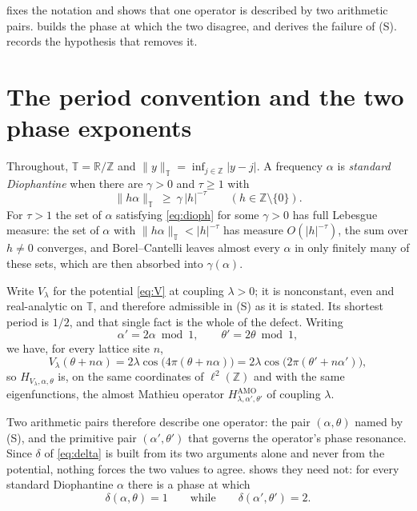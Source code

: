 \documentclass[11pt,reqno]{amsart}
\theoremstyle{plain}
\theoremstyle{definition}
\theoremstyle{remark}
\numberwithin{equation}{section}
\begin{document}
 fixes the notation and shows that one operator is
described by two arithmetic pairs.  builds the phase at
which the two disagree, and  derives the failure of (S).
 records the hypothesis that removes it.

\section{The period convention and the two phase exponents}
\label{sec:convention}

Throughout, $\mathbb T=\mathbb R/\mathbb Z$ and
$\lVert y\rVert_{\mathbb T}=\inf_{j\in\mathbb Z}|y-j|$. A frequency
$\alpha$ is \emph{standard Diophantine} when there are $\gamma>0$ and
$\tau\ge1$ with
\begin{equation}
  \label{eq:dioph}
  \lVert h\alpha\rVert_{\mathbb T}\ \ge\ \gamma\,|h|^{-\tau}
  \qquad (h\in\mathbb Z\setminus\{0\}).
\end{equation}
For $\tau>1$ the set of $\alpha$ satisfying \eqref{eq:dioph} for some
$\gamma>0$ has full Lebesgue measure: the set of $\alpha$ with
$\lVert h\alpha\rVert_{\mathbb T}<|h|^{-\tau}$ has measure $O(|h|^{-\tau})$,
the sum over $h\ne0$ converges, and Borel--Cantelli leaves almost every
$\alpha$ in only finitely many of these sets, which are then absorbed into
$\gamma(\alpha)$.

Write $V_\lambda$ for the potential \eqref{eq:V} at coupling $\lambda>0$; it
is nonconstant, even and real-analytic on $\mathbb T$, and therefore
admissible in (S) as it is stated. Its shortest period is
$1/2$, and that single fact is the whole of the defect. Writing
\begin{equation}
  \label{eq:primitive}
  \alpha'=2\alpha \bmod 1,
  \qquad
  \theta'=2\theta \bmod 1,
\end{equation}
we have, for every lattice site $n$,
\begin{equation}
  \label{eq:same-operator}
  V_\lambda(\theta+n\alpha)
  =2\lambda\cos\bigl(4\pi(\theta+n\alpha)\bigr)
  =2\lambda\cos\bigl(2\pi(\theta'+n\alpha')\bigr),
\end{equation}
so $H_{V_\lambda,\alpha,\theta}$ is, on the same coordinates of
$\ell^2(\mathbb Z)$ and with the same eigenfunctions, the almost Mathieu
operator $H^{\mathrm{AMO}}_{\lambda,\alpha',\theta'}$ of coupling $\lambda$.

Two arithmetic pairs therefore describe one operator: the pair
$(\alpha,\theta)$ named by (S), and the primitive pair
$(\alpha',\theta')$ that governs the operator's phase resonance. Since
$\delta$ of \eqref{eq:delta} is built from its two arguments alone and never
from the potential, nothing forces the two values to agree.
 shows they need not: for every standard Diophantine
$\alpha$ there is a phase at which
\begin{equation*}
  \delta(\alpha,\theta)=1
  \qquad\text{while}\qquad
  \delta(\alpha',\theta')=2 .
\end{equation*}
\end{document}
